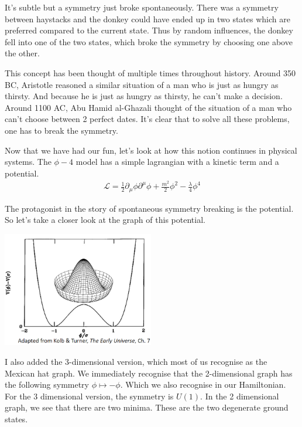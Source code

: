 \documentclass{article}
\numberwithin{equation}{section}
\begin{document}
It's subtle but a symmetry just broke spontaneously.
There was a symmetry between haystacks and the donkey could have ended up in two states which are preferred compared to the current state.
Thus by random influences, the donkey fell into one of the two states, which broke the symmetry by choosing one above the other.

This concept has been thought of multiple times throughout history.
Around 350 BC, Aristotle reasoned a similar situation of a man who is just as hungry as thirsty. 
And because he is just as hungry as thirsty, he can't make a decision.
Around 1100 AC, Abu Hamid al-Ghazali thought of the situation of a man who can't choose between 2 perfect dates.
It's clear that to solve all these problems, one has to break the symmetry.

Now that we have had our fun, let's look at how this notion continues in physical systems.
The $\phi-4$ model has a simple lagrangian with a kinetic term and a potential.
\begin{align}
    \mathcal{L}=\frac{1}{2}\partial_\mu\phi\partial^\mu\phi +\frac{m^2}{2}\phi^2-\frac{\lambda}{4}\phi^4
    \label{eq:phi-4-Lagrangian}
\end{align}

The protagonist in the story of spontaneous symmetry breaking is the potential.
So let's take a closer look at the graph of this potential.

\begin{center}
\includegraphics[width=250px]{Knipsel.PNG}    
\end{center}

I also added the 3-dimensional version, which most of us recognise as the Mexican hat graph.
We immediately recognise that the 2-dimensional graph has the following symmetry $\phi\mapsto -\phi$.
Which we also recognise in our Hamiltonian.
For the 3 dimensional version, the symmetry is $U(1)$.
In the 2 dimensional graph, we see that there are two minima. 
These are the two degenerate ground states.
\end{document}
